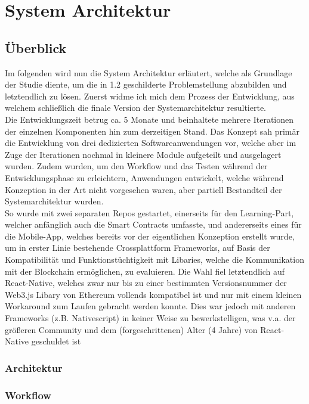 \chapter{System Architektur}
\label{kap:Kapitel03}

\section{Überblick}
Im folgenden wird nun die System Architektur erläutert, welche als Grundlage der Studie diente, um die in 1.2 geschilderte Problemstellung abzubilden und letztendlich zu lösen. 
Zuerst widme ich mich dem Prozess der Entwicklung, aus welchem schließlich die finale Version der Systemarchitektur resultierte. \\
Die Entwicklungszeit betrug ca. 5 Monate und beinhaltete mehrere Iterationen der einzelnen Komponenten hin zum derzeitigen Stand. Das Konzept sah primär die Entwicklung von drei dedizierten Softwareanwendungen vor, welche aber im Zuge der Iterationen nochmal in kleinere Module aufgeteilt und ausgelagert wurden. Zudem wurden, um den Workflow und das Testen während der Entwicklungsphase zu erleichtern, Anwendungen entwickelt, welche während Konzeption in der Art nicht vorgesehen waren, aber partiell Bestandteil der Systemarchitektur wurden. \\
So wurde mit zwei separaten Repos gestartet, einerseits für den Learning-Part, welcher anfänglich auch die Smart Contracts umfasste, und andererseits eines für die Mobile-App, welches bereits vor der eigentlichen Konzeption erstellt wurde, um in erster Linie bestehende Crossplattform Frameworks, auf Basis der Kompatibilität und Funktionstüchtigkeit mit Libaries, welche die Kommunikation mit der Blockchain ermöglichen, zu evaluieren. Die Wahl fiel letztendlich auf React-Native, welches zwar nur bis zu einer bestimmten Versionsnummer  der Web3.js Libary von Ethereum vollends kompatibel ist und nur mit einem kleinen Workaround zum Laufen gebracht werden konnte. Dies war jedoch mit anderen Frameworks (z.B. Nativescript) in keiner Weise zu bewerkstelligen, was v.a. der größeren Community und dem (forgeschrittenen) Alter (4 Jahre) von React-Native geschuldet ist \\
\subsection{Architektur}
\subsection{Workflow}





